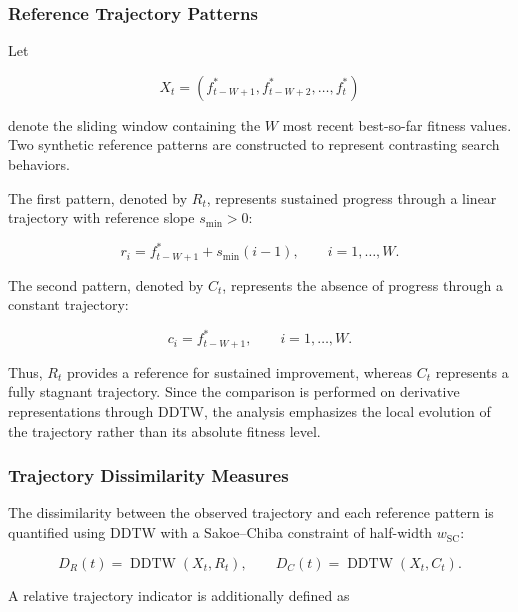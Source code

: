 \documentclass[journal,article,submit,moreauthors]{Definitions/mdpi}
\begin{document}
\subsubsection{Reference Trajectory Patterns}

Let

\begin{equation}
X_t =
\left(
f_{t-W+1}^*,
f_{t-W+2}^*,
\dots,
f_t^*
\right)
\label{eq:trajectory_window}
\end{equation}

denote the sliding window containing the $W$ most recent best-so-far fitness
values. Two synthetic reference patterns are constructed to represent
contrasting search behaviors.

The first pattern, denoted by $R_t$, represents sustained progress through
a linear trajectory with reference slope $s_{\min}>0$:

\begin{equation}
r_i =
f_{t-W+1}^*
+
s_{\min}(i-1),
\qquad i=1,\ldots,W.
\label{eq:ramp_pattern}
\end{equation}

The second pattern, denoted by $C_t$, represents the absence of progress
through a constant trajectory:

\begin{equation}
c_i =
f_{t-W+1}^*,
\qquad i=1,\ldots,W.
\label{eq:constant_pattern}
\end{equation}

Thus, $R_t$ provides a reference for sustained improvement, whereas $C_t$
represents a fully stagnant trajectory. Since the comparison is performed
on derivative representations through DDTW, the analysis emphasizes the
local evolution of the trajectory rather than its absolute fitness level.


\subsubsection{Trajectory Dissimilarity Measures}

The dissimilarity between the observed trajectory and each reference pattern
is quantified using DDTW with a Sakoe--Chiba constraint of half-width
$w_{\mathrm{SC}}$:

\begin{equation}
D_R(t)
=
\operatorname{DDTW}(X_t,R_t),
\qquad
D_C(t)
=
\operatorname{DDTW}(X_t,C_t).
\label{eq:ddtw_distances}
\end{equation}

A relative trajectory indicator is additionally defined as
\end{document}
